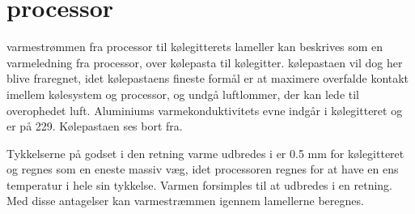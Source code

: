 \section{processor}
varmestrømmen fra processor til kølegitterets lameller kan beskrives som en varmeledning fra processor, over kølepasta til kølegitter. 
kølepastaen vil dog her blive fraregnet, idet kølepastaens fineste formål er at maximere overfalde kontakt imellem kølesystem og processor, og undgå luftlommer, der kan lede til overophedet luft.
Aluminiums varmekonduktivitets evne indgår i kølegitteret og er på 229. Kølepastaen ses bort fra.

Tykkelserne på godset i den retning varme udbredes i er 0.5 mm for kølegitteret og regnes som en eneste massiv væg, idet processoren regnes for at have en ens temperatur i hele sin tykkelse. Varmen forsimples til at udbredes i en retning. Med disse antagelser kan varmestræmmen igennem lamellerne beregnes.   